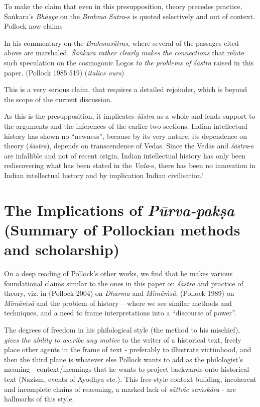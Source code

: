 To make the claim that even in this presupposition, theory precedes practice, Śaṅkara's {\sl Bhāṣya} on the {\sl Brahma Sūtra}-s is quoted selectively and out of context. Pollock now claims 
\begin{myquote}
In his commentary on the {\sl Brahmasūtras}, where several of the passages cited above are marshaled, {\sl Śaṅkara rather clearly makes the connections} that relate such speculation on the cosmogonic Logos {\sl to the problems of śāstra} raised in this paper.
\hfill	(Pollock 1985:519) ({\sl italics ours})
\end{myquote}

\newpage

This is a very serious claim, that requires a detailed rejoinder, which is beyond the scope of the current discussion. 

As this is the presupposition, it implicates {\sl śāstra} as a whole and lends support to the arguments and the inferences of the earlier two sections. Indian intellectual history has shown no ``newness'', because by its very nature, its dependence on theory ({\sl śāstra}), depends on transcendence of Vedas.  Since the Vedas and {\sl śāstra}-s are infallible and not of recent origin, Indian intellectual history has only been rediscovering what has been stated in the {\sl Veda}-s, there has been no innovation in Indian intellectual history and by implication Indian civilisation!\\[-21pt]

\section*{The Implications of {{\sl\bfseries Pūrva-pakṣa}\relax} (Summary of Pollockian methods and scholarship)}

On a deep reading of Pollock's other works, we find that he makes various foundational claims similar to the ones in this paper on {\sl śāstra} and practice of theory, viz. in (Pollock 2004) on {\sl Dharma} and {\sl Mīmāṁsā}, (Pollock 1989) on {\sl Mīmāṁsā} and the problem of history -- where we see similar methods and techniques, and a need  to frame interpretations into a ``discourse of power''.

The degrees of freedom in his philological style (the method to his mischief), {\sl gives the ability to ascribe any motive} to the writer of a historical text, freely place other agents in the frame of text - preferably to illustrate victimhood, and then the third plane is whatever else Pollock wants to add as the philologist's meaning - context/meanings that he wants to project backwards onto historical text (Nazism, events of Ayodhya etc.). This free-style context building, incoherent and incomplete chains of reasoning, a marked lack of {\sl sāttvic saṁskāra} - are hallmarks of this style. 

